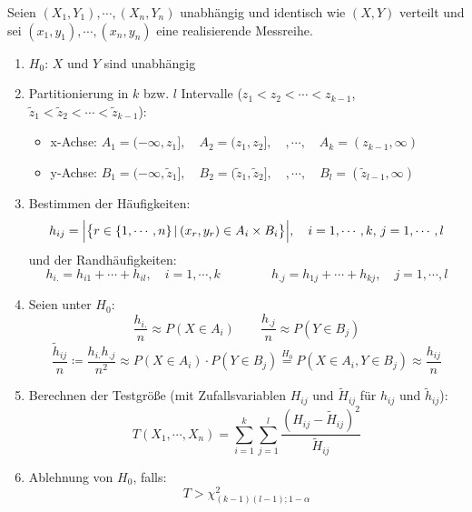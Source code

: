             Seien \( (X_1, Y_1), \cdots, (X_n, Y_n) \) unabhängig und identisch wie \( (X, Y) \) verteilt und sei \( (x_1, y_1), \cdots, (x_n, y_n) \) eine realisierende Messreihe.
            \begin{enumerate}
            	\item \(H_0\): \quad \(X\) und \(Y\) sind unabhängig
            	\item Partitionierung in \(k\) bzw. \(l\) Intervalle (\( z_1 < z_2 < \cdots < z_{k-1} \), \( \tilde{z}_1 < \tilde{z}_2 < \cdots < \tilde{z}_{k-1} \)):
                	\begin{itemize}
                		\item x-Achse: \( A_1 = (-\infty, z_1], \quad A_2 = (z_1, z_2], \quad, \cdots, \quad A_k = (z_{k-1}, \infty) \)
                		\item y-Achse: \( B_1 = (-\infty, \tilde{z}_1], \quad B_2 = (\tilde{z}_1, \tilde{z}_2], \quad, \cdots, \quad B_l = (\tilde{z}_{l-1}, \infty) \)
                	\end{itemize}
            	\item Bestimmen der Häufigkeiten:
                	\begin{equation*}
	                	h_{ij} = \Big| \big\{ r \in \{ 1, \cdots, n \} \,\vert\, (x_r, y_r) \in A_i \times B_i \big\} \Big|, \quad i = 1, \cdots, k,\, j = 1, \cdots, l
                	\end{equation*}
                	und der Randhäufigkeiten:
                	\begin{equation*}
	                	h_{i.} = h_{i1} + \cdots + h_{il}, \quad i = 1, \cdots, k \qquad\qquad h_{.j} = h_{1j} + \cdots + h_{kj}, \quad j = 1, \cdots, l
                	\end{equation*}
	            \item Seien unter \(H_0\):
		            \begin{equation*}
			            \frac{h_{i.}}{n} \approx P(X \in A_i) \qquad \frac{h_{.j}}{n} \approx P(Y \in B_j)
		            \end{equation*}
		            \begin{equation*}
			            \frac{\tilde{h}_{ij}}{n} \coloneqq \frac{h_{i.} h_{.j}}{n^2} \approx P(X \in A_i) \cdot P(Y \in B_j) \overset{H_0}{=} P(X \in A_i, Y \in B_j) \approx \frac{h_{ij}}{n}
		            \end{equation*}
			    \item Berechnen der Testgröße (mit Zufallsvariablen \( H_{ij} \) und \( \tilde{H}_{ij} \) für \( h_{ij} \) und \( \tilde{h}_{ij} \)):
				    \begin{equation*}
					    T(X_1, \cdots, X_n) = \sum_{i = 1}^{k} \sum_{j = 1}^{l} \frac{(H_{ij} - \tilde{H}_{ij})^2}{\tilde{H}_{ij}}
				    \end{equation*}
				\item Ablehnung von \(H_0\), falls:
					\begin{equation*}
						T > \chi_{(k - 1)(l - 1); 1 - \alpha}^2
					\end{equation*}
            \end{enumerate}

